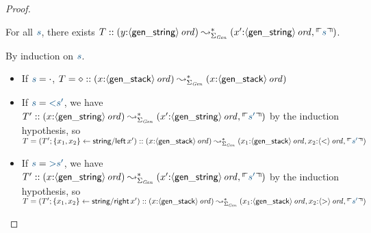 \begin{proof}
\begin{lemma} For all $\obj{s}$, there exists
$T :: ({y{:}\istrue{\susp{\sf gen\_string}}}) \leadsto^*_{\Sigma_{\it Gen}} 
({x'{:}\istrue{\susp{\sf gen\_string}}, \ctxinterp{s}})$.
\end{lemma}
\noindent
By induction on $\obj{s}$.
\begin{itemize}
\item If $\obj{s} = \cdot$, $T = \diamond ::
({x{:}{\langle {\sf gen\_stack} \rangle}\,{{\it ord}}}) \leadsto^*_{\Sigma_{\it Gen}} 
(x{:}{\langle {\sf gen\_stack} \rangle}\,{{\it ord}})$
\item If $\obj{s} = \obj{{\sf <}s' }$, we have 
$T' :: ({x{:}\istrue{\susp{\sf gen\_string}}}) \leadsto^*_{\Sigma_{\it Gen}} 
(x'{:}\istrue{\susp{\sf gen\_string}}, \ctxinterp{s'})$ by the induction
hypothesis, so $T = (T'; \trstep{x_1, x_2}{{\sf string/left}\,x'}) :: 
({x{:}\istrue{\susp{\sf gen\_stack}}}) \leadsto^*_{\Sigma_{\it Gen}} 
(x_1{:}\istrue{\susp{\sf gen\_stack}},
 x_2{:}\istrue{\susp{\sf <}},
\ctxinterp{s'})$
\item If $\obj{s} = \obj{{\sf >}s' }$, we have 
$T' :: ({x{:}\istrue{\susp{\sf gen\_string}}}) \leadsto^*_{\Sigma_{\it Gen}} 
(x'{:}\istrue{\susp{\sf gen\_string}}, \ctxinterp{s'})$ by the induction
hypothesis, so $T = (T'; \trstep{x_1, x_2}{{\sf string/right}\,x'}) :: 
({x{:}\istrue{\susp{\sf gen\_stack}}}) \leadsto^*_{\Sigma_{\it Gen}} 
(x_1{:}\istrue{\susp{\sf gen\_stack}},
 x_2{:}\istrue{\susp{\sf >}},
\ctxinterp{s'})$
\end{itemize}


\end{proof}
